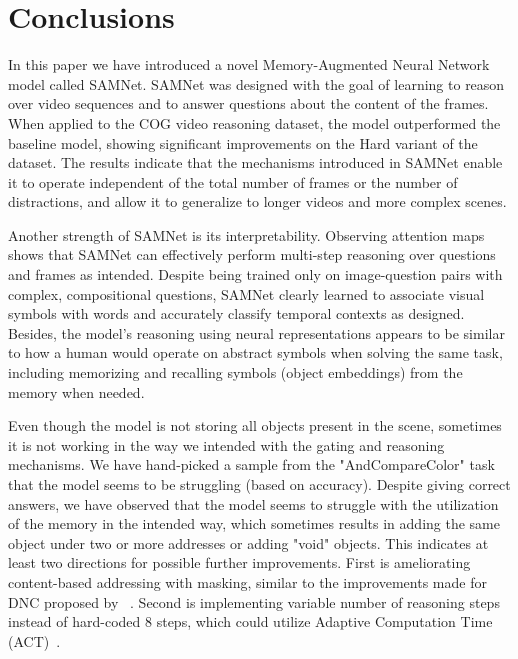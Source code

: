 \section{Conclusions}

In this paper we have introduced a novel Memory-Augmented Neural Network model called SAMNet.
SAMNet was designed with the goal of learning to reason over video sequences and to answer questions about the content of the frames.
When applied to the COG video reasoning dataset, the model outperformed the baseline model, showing significant improvements on the Hard variant of the dataset.
The results indicate that the mechanisms introduced in SAMNet  enable it to operate independent of the total number of frames or the number of distractions, and allow it to generalize to longer videos and more complex scenes. 

Another strength of SAMNet is its interpretability.
Observing attention maps shows that SAMNet can effectively perform multi-step reasoning over questions and frames as intended. 
Despite being trained only on image-question pairs with complex, compositional questions, SAMNet clearly learned to associate visual symbols with words and accurately classify temporal contexts as designed.
Besides, the model's reasoning using neural representations appears to be similar to how a human would operate on abstract symbols when solving the same task, including memorizing and recalling symbols (object embeddings) from the memory when needed.

Even though the model is not storing all objects present in the scene, sometimes it is not working in the way we intended with the gating and reasoning mechanisms.
We have hand-picked a sample from the "AndCompareColor" task that the model seems to be struggling (based on accuracy).
Despite giving correct answers, we have observed that the model seems to struggle with the utilization of the memory in the intended way, which sometimes results in adding the same object under two or more addresses or adding "void" objects.
This indicates at least two directions for possible further improvements.
First is ameliorating content-based addressing with masking, similar to the improvements made for DNC proposed by ~\cite{csordas2019improved}.
Second is implementing variable number of reasoning steps instead of hard-coded 8 steps, which could utilize Adaptive Computation Time (ACT)~\cite{graves2016adaptive}.




